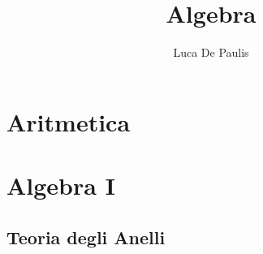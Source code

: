 \documentclass[italian,oneside,headinclude,10pt]{scrbook}
\begin{document}
\author{Luca De Paulis}
\title{Algebra}
\maketitle

\tableofcontents
\part{Aritmetica}
% 
% 
% 
% 
% 

% 















\part{Algebra I}







\chapter{Teoria degli Anelli}






\end{document}
